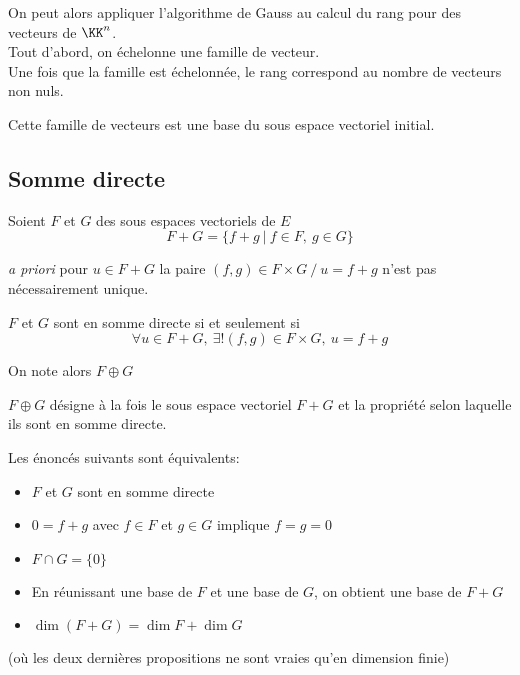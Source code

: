 \documentclass[../main.tex]{subfile}
\begin{document}
On peut alors appliquer l'algorithme de Gauss  au calcul du rang pour des vecteurs de $\KK^n$.\\
Tout d'abord, on échelonne une famille de vecteur.\\
Une fois que la famille est échelonnée, le rang correspond au nombre de vecteurs non nuls.\\

\begin{rema}
	Cette famille de vecteurs est une base du sous espace vectoriel initial.
\end{rema}

\subsection{Somme directe}
	Soient $F$ et $G$ des sous espaces vectoriels de $E$\\
	$$F+G = \{f+g \ | \ f \in F, \ g \in G\}$$

	\textit{a priori} pour $u \in F+G$
	la paire $(f,g) \in F \times G \ / \ u=f+g$ n'est pas nécessairement unique.\\

\begin{defi}
	$F$ et $G$ sont en somme directe si et seulement si 
	$$\forall u \in F + G, \ \exists! (f,g) \in F \times G, \ u = f+g$$
\end{defi}

\begin{nota}
	On note alors $F \oplus G$
\end{nota}

\begin{rema}
	$F \oplus G$ désigne à la fois le sous espace vectoriel $F+G$ et la propriété selon laquelle ils sont en somme directe.
\end{rema}


\begin{prop}
	Les énoncés suivants sont équivalents:
\begin{itemize}	
	\item $F$ et $G$ sont en somme directe
	\item $0 = f+g$ avec $f \in F$ et $g \in G$ implique $f=g=0$
	\item $F \cap G = \{0\}$
	\item En réunissant une base de $F$ et une base de $G$, on obtient une base de $F+G$
	\item $\dim(F+G) = \dim F + \dim G$
\end{itemize}
	(où les deux dernières propositions ne sont vraies qu'en dimension finie)
\end{prop}
\end{document}
